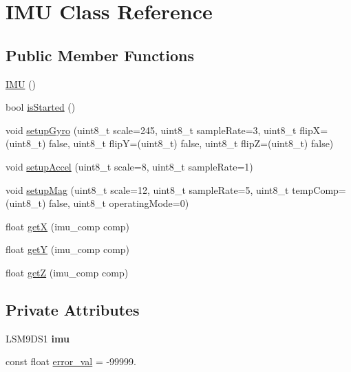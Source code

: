 \hypertarget{class_i_m_u}{}\section{I\+MU Class Reference}
\label{class_i_m_u}
\subsection*{Public Member Functions}
\begin{DoxyCompactItemize}
\item 
\hyperlink{class_i_m_u_a5d36c5fa0688efe1a013679dbdcef4cc}{I\+MU} ()
\item 
bool \hyperlink{class_i_m_u_a252166103441e5b7ce10d123c9081505}{is\+Started} ()
\item 
void \hyperlink{class_i_m_u_afcb732654cf42908c921456bf6b2a3fd}{setup\+Gyro} (uint8\+\_\+t scale=245, uint8\+\_\+t sample\+Rate=3, uint8\+\_\+t flipX=(uint8\+\_\+t) false, uint8\+\_\+t flipY=(uint8\+\_\+t) false, uint8\+\_\+t flipZ=(uint8\+\_\+t) false)
\item 
void \hyperlink{class_i_m_u_a728c6535b560edafe756982d12f06db0}{setup\+Accel} (uint8\+\_\+t scale=8, uint8\+\_\+t sample\+Rate=1)
\item 
void \hyperlink{class_i_m_u_ac3aaf3be5c6b61c2bd08f23d76946842}{setup\+Mag} (uint8\+\_\+t scale=12, uint8\+\_\+t sample\+Rate=5, uint8\+\_\+t temp\+Comp=(uint8\+\_\+t) false, uint8\+\_\+t operating\+Mode=0)
\item 
float \hyperlink{class_i_m_u_a949d2a569dcf4b6d8e3ec31b3fb269cb}{getX} (imu\+\_\+comp comp)
\item 
float \hyperlink{class_i_m_u_af5a2bba6153657625fae0fdc8a228a40}{getY} (imu\+\_\+comp comp)
\item 
float \hyperlink{class_i_m_u_acbea044b92a2e2f2cc554af45692dc62}{getZ} (imu\+\_\+comp comp)
\end{DoxyCompactItemize}
\subsection*{Private Attributes}
\begin{DoxyCompactItemize}
\item 
\mbox{\label{class_i_m_u_a7f5e86aa84ecc823dfe5683bd1c1752d}} 
L\+S\+M9\+D\+S1 {\bfseries imu}
\item 
const float \hyperlink{class_i_m_u_ad516a2a064d93e7fc630f470cc5e50e1}{error\+\_\+val} = -\/99999.
\end{DoxyCompactItemize}


